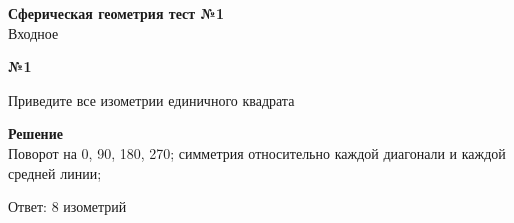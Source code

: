 


    \begin{center}
        \textbf{Сферическая геометрия тест №1}\\
        Входное
    \end{center}

    \begin{center}
        \textbf{№1}
    \end{center}

    Приведите все изометрии единичного квадрата

    \textbf{Решение}\\

    Поворот на 0, 90, 180, 270; симметрия относительно каждой диагонали и каждой средней линии;

    Ответ: 8 изометрий



